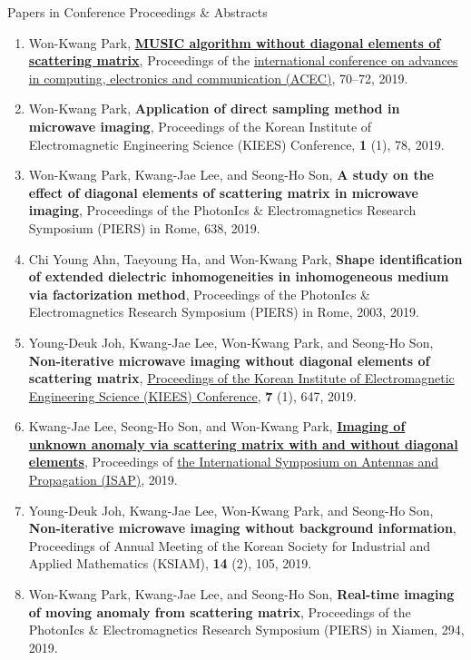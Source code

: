 \documentclass{resume} %
\begin{document}
\begin{rSection}{Papers in Conference Proceedings \& Abstracts}
\begin{enumerate}
\item\label{C-ACEC2019} Won-Kwang Park, \href{https://doi.org/10.15224/978-1-63248-165-8-14}{\textbf{MUSIC algorithm without diagonal elements of scattering matrix}}, Proceedings of the \href{https://acec.theired.org/}{ international conference on advances in computing, electronics and communication (ACEC)}, 70--72, 2019.
\item\label{C-KIEES2019A} Won-Kwang Park, \textbf{Application of direct sampling method in microwave imaging}, Proceedings of the Korean Institute of Electromagnetic Engineering Science (KIEES) Conference, \textbf{1} (1), 78, 2019.
\item\label{C-PIERS2019A} Won-Kwang Park, Kwang-Jae Lee, and Seong-Ho Son, \textbf{A study on the effect of diagonal elements of scattering matrix in microwave imaging}, Proceedings of the PhotonIcs \& Electromagnetics Research Symposium (PIERS) in Rome, 638, 2019.
\item\label{C-PIERS2019B} Chi Young Ahn, Taeyoung Ha, and Won-Kwang Park, \textbf{Shape identification of extended dielectric inhomogeneities in inhomogeneous medium via factorization method}, Proceedings of the PhotonIcs \& Electromagnetics Research Symposium (PIERS) in Rome, 2003, 2019.
\item\label{C-KIEES2019B} Young-Deuk Joh, Kwang-Jae Lee, Won-Kwang Park, and Seong-Ho Son, \textbf{Non-iterative microwave imaging without diagonal elements of scattering matrix}, \href{http://kiees_sch.jslab.org/download/(KIEES)_2019_Summer_Conference_paper.zip}{Proceedings of the Korean Institute of Electromagnetic Engineering Science (KIEES) Conference}, \textbf{7} (1), 647, 2019.
\item\label{C-ISAP2019} Kwang-Jae Lee, Seong-Ho Son, and Won-Kwang Park, \href{https://ieeexplore.ieee.org/document/8963454}{\textbf{Imaging of unknown anomaly via scattering matrix with and without diagonal elements}}, Proceedings of \href{http://www.em-conf.com/isap2019/index.php}{the International Symposium on Antennas and Propagation (ISAP)}, 2019.
\item\label{C-KSIAM2019} Young-Deuk Joh, Kwang-Jae Lee, Won-Kwang Park, and Seong-Ho Son, \textbf{Non-iterative microwave imaging without background information}, Proceedings of Annual Meeting of the Korean Society for Industrial and Applied Mathematics (KSIAM), \textbf{14} (2), 105, 2019.
\item\label{C-PIERS2019C} Won-Kwang Park, Kwang-Jae Lee, and Seong-Ho Son, \textbf{Real-time imaging of moving anomaly from scattering matrix}, Proceedings of the PhotonIcs \& Electromagnetics Research Symposium (PIERS) in Xiamen, 294, 2019.

\end{enumerate}
\end{rSection}
\end{document}
